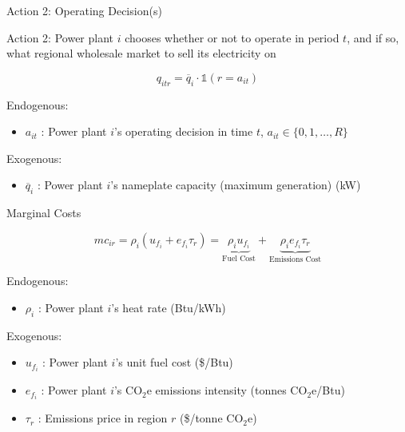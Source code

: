 \documentclass[11pt, aspectratio = 169]{beamer}
\newcommand{\1}{\mathds{1}}
\begin{document}
\begin{frame}{Action 2: Operating Decision(s)}
    
Action 2: Power plant $i$ chooses whether or not to operate in period $t$, and if so, what regional wholesale market to sell its electricity on
\vfill 

\begin{equation}
    q_{itr} = \overline{q}_i \cdot \mathds{1}(r = a_{it})
\end{equation}
\vfill

Endogenous:
\begin{itemize}
    \item $a_{it}$ : Power plant $i$'s operating decision in time $t$, $a_{it} \in \{0, 1, \ldots, R\}$
\end{itemize}
Exogenous:
\begin{itemize}
    \item $\overline{q}_i$ : Power plant $i$'s nameplate capacity (maximum generation) (kW)
\end{itemize}

\end{frame}




\begin{frame}{Marginal Costs}
    
\begin{equation}
    mc_{ir} = \rho_i(u_{f_i} + e_{f_i} \tau_r) = \underbrace{\rho_i u_{f_i}}_{\text{Fuel Cost}} + \underbrace{\rho_i e_{f_i} \tau_r}_{\text{Emissions Cost}}
\end{equation}

\vfill
Endogenous:
\begin{itemize}
    \item $\rho_i$ : Power plant $i$'s heat rate (Btu/kWh)
\end{itemize}
Exogenous:
\begin{itemize}
    \item $u_{f_i}$ : Power plant $i$'s unit fuel cost (\$/Btu)
    \item $e_{f_i}$ : Power plant $i$'s CO$_2$e emissions intensity (tonnes CO$_2$e/Btu)
    \item $\tau_r$ : Emissions price in region $r$ (\$/tonne CO$_2$e)
\end{itemize}

\end{frame}
\end{document}
